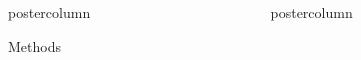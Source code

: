 \documentclass[final,hyperref={pdfpagelabels=false}]{beamer}
\begin{document}
\begin{frame}
\begin{columns}
\begin{column}{1\textwidth}
\begin{columns}[T]
\begin{column}{.484\textwidth}
\begin{beamercolorbox}[center,wd=\textwidth]{postercolumn}
\begin{minipage}[T]{.95\textwidth}
\begin{block}{\footnotesize Methods}
%
%
%
\end{block}



\end{minipage}
\end{beamercolorbox}
\end{column}

\begin{column}{.484\textwidth}
\begin{beamercolorbox}[center,wd=\textwidth]{postercolumn}
\begin{minipage}[T]{.95\textwidth}  %



\end{minipage}
\end{beamercolorbox}
\end{column}
\end{columns}
\end{column}
\end{columns}
\end{frame}
\end{document}
